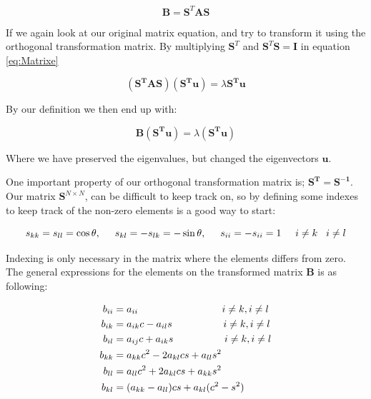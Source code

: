 \documentclass[twoside,onecolumn]{article}
\begin{document}
\begin{equation}
\mathbf{B} = \mathbf{S}^T \mathbf{AS}
\label{eq:Matrixe}
\end{equation}

\bigskip

If we again look at our original matrix equation, and try to transform it using the orthogonal transformation matrix. By multiplying $\mathbf{S}^T$ and $\mathbf{S}^T\mathbf{S} = \mathbf{I}$ in equation \ref{eq:Matrixe}

\bigskip

\begin{equation*}
(\mathbf{S^TAS})(\mathbf{S^Tu}) = \lambda \mathbf{S^Tu}
\end{equation*}

By our definition we then end up with: 

\begin{equation}
\mathbf{B}(\mathbf{S^Tu}) = \lambda (\mathbf{S^Tu})
\end{equation}

Where we have preserved the eigenvalues, but changed the eigenvectors $\mathbf{u}$. 

\bigskip

One important property of our orthogonal transformation matrix is; $\mathbf{S^T} = \mathbf{S^{-1}}$. Our matrix $\mathbf{S}^{N\times N}$, can be difficult to keep track on, so by defining some indexes to keep track of the non-zero elements is a good way to start:


\begin{equation*}
s_{kk} = s_{ll} = \cos\theta,  \hspace{0.5cm} s_{kl} = -s_{lk} = -\sin\theta, \hspace{0.5cm} s_{ii} = -s_{ii} = 1 \hspace{0.5cm} i \neq k \hspace{0.3cm} i \neq l
\end{equation*}

Indexing is only necessary in the matrix where the elements differs from zero. The general expressions for the elements on the transformed matrix $\mathbf{B}$ is as following: 

\bigskip 

\begin{align}
b_{ii} &= a_{ii} \hspace{2.95cm} i \neq k,i \neq l\\
b_{ik} &= a_{ik}c - a_{il} s \hspace{1.8cm} i \neq k,i \neq l\\
b_{il} &= a_{ij}c + a_{ik}s \hspace{1.8cm}i \neq k,i \neq l\\
b_{kk} &= a_{kk}c^2 - 2a_{kl}cs + a_{ll}s^2 \\
b_{ll} &= a_{ll}c^2 + 2a_{kl}cs + a_{kk}s^2\\
b_{kl} &= (a_{kk} - a_{ll})cs + a_{kl}(c^2-s^2) 
\label{eq:bkl}
\end{align}
\end{document}
